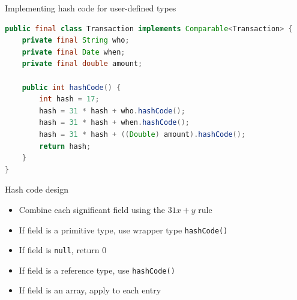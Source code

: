 \documentclass[8pt,a4paper,compress]{beamer}
\begin{document}
\begin{frame}[fragile]
\pause

Implementing hash code for user-defined types
\begin{lstlisting}[language=Java]
public final class Transaction implements Comparable<Transaction> {
    private final String who;
    private final Date when;
    private final double amount;

    public int hashCode() {
        int hash = 17;
        hash = 31 * hash + who.hashCode();
        hash = 31 * hash + when.hashCode();
        hash = 31 * hash + ((Double) amount).hashCode();
        return hash;
    }
}
\end{lstlisting}

\pause
\bigskip

Hash code design
\begin{itemize}
\item Combine each significant field using the $31x + y$ rule

\item If field is a primitive type, use wrapper type \lstinline{hashCode()}

\item If field is \lstinline{null}, return 0

\item If field is a reference type, use \lstinline{hashCode()}

\item If field is an array, apply to each entry
\end{itemize}
\end{frame}
\end{document}

